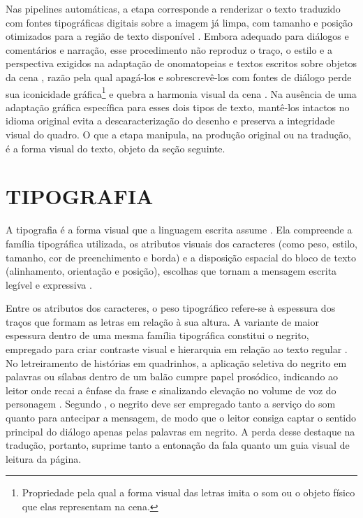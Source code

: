 \documentclass[
    12pt,
    openright,
    oneside,
    a4paper,
    chapter=TITLE,
    section=TITLE,
    english,
    brazilian,
    brazil
]{abntex2}
\begin{document}
Nas pipelines automáticas, a etapa corresponde a renderizar o texto traduzido com fontes tipográficas digitais sobre a imagem já limpa, com tamanho e posição otimizados para a região de texto disponível \cite{lippmann-etal-2025-context}. Embora adequado para diálogos e comentários e narração, esse procedimento não reproduz o traço, o estilo e a perspectiva exigidos na adaptação de onomatopeias e textos escritos sobre objetos da cena \cite{assis2016especificidades, assis2018aprox, linsley2020letterer}, razão pela qual apagá-los e sobrescrevê-los com fontes de diálogo perde sua iconicidade gráfica\footnote{Propriedade pela qual a forma visual das letras imita o som ou o objeto físico que elas representam na cena.} e quebra a harmonia visual da cena \cite{leitao2010estrategias}. Na ausência de uma adaptação gráfica específica para esses dois tipos de texto, mantê-los intactos no idioma original evita a descaracterização do desenho e preserva a integridade visual do quadro. O que a etapa manipula, na produção original ou na tradução, é a forma visual do texto, objeto da seção seguinte.

\section{TIPOGRAFIA}
\label{sec:tipografia}

A tipografia é a forma visual que a linguagem escrita assume \cite{lupton2004thinking}. Ela compreende a família tipográfica utilizada, os atributos visuais dos caracteres (como peso, estilo, tamanho, cor de preenchimento e borda) e a disposição espacial do bloco de texto (alinhamento, orientação e posição), escolhas que tornam a mensagem escrita legível e expressiva \cite{luna2018typography}.

Entre os atributos dos caracteres, o peso tipográfico refere-se à espessura dos traços que formam as letras em relação à sua altura. A variante de maior espessura dentro de uma mesma família tipográfica constitui o negrito, empregado para criar contraste visual e hierarquia em relação ao texto regular \cite{lupton2004thinking}. No letreiramento de histórias em quadrinhos, a aplicação seletiva do negrito em palavras ou sílabas dentro de um balão cumpre papel prosódico, indicando ao leitor onde recai a ênfase da frase e sinalizando elevação no volume de voz do personagem \cite{mccloud1993understanding}. Segundo , o negrito deve ser empregado tanto a serviço do som quanto para antecipar a mensagem, de modo que o leitor consiga captar o sentido principal do diálogo apenas pelas palavras em negrito. A perda desse destaque na tradução, portanto, suprime tanto a entonação da fala quanto um guia visual de leitura da página.
\end{document}
